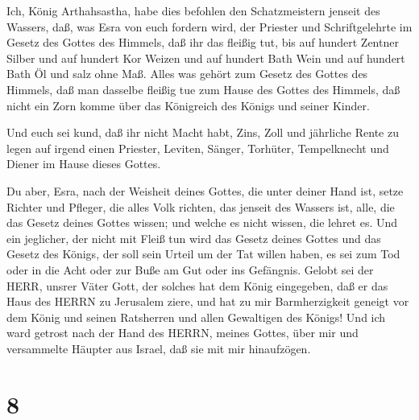  Ich, König Arthahsastha, habe dies befohlen den
Schatzmeistern jenseit des Wassers, daß, was Esra von euch fordern wird,
der Priester und Schriftgelehrte im Gesetz des Gottes des Himmels, daß
ihr das fleißig tut,  bis auf hundert Zentner Silber und
auf hundert Kor Weizen und auf hundert Bath Wein und auf hundert Bath Öl
und salz ohne Maß.  Alles was gehört zum Gesetz des Gottes
des Himmels, daß man dasselbe fleißig tue zum Hause des Gottes des
Himmels, daß nicht ein Zorn komme über das Königreich des Königs und
seiner Kinder.

 Und euch sei kund, daß ihr nicht Macht habt, Zins, Zoll
und jährliche Rente zu legen auf irgend einen Priester, Leviten, Sänger,
Torhüter, Tempelknecht und Diener im Hause dieses Gottes.

 Du aber, Esra, nach der Weisheit deines Gottes, die unter
deiner Hand ist, setze Richter und Pfleger, die alles Volk richten, das
jenseit des Wassers ist, alle, die das Gesetz deines Gottes wissen; und
welche es nicht wissen, die lehret es.  Und ein jeglicher,
der nicht mit Fleiß tun wird das Gesetz deines Gottes und das Gesetz des
Königs, der soll sein Urteil um der Tat willen haben, es sei zum Tod
oder in die Acht oder zur Buße am Gut oder ins Gefängnis. 
Gelobt sei der HERR, unsrer Väter Gott, der solches hat dem König
eingegeben, daß er das Haus des HERRN zu Jerusalem ziere, 
und hat zu mir Barmherzigkeit geneigt vor dem König und seinen
Ratsherren und allen Gewaltigen des Königs! Und ich ward getrost nach
der Hand des HERRN, meines Gottes, über mir und versammelte Häupter aus
Israel, daß sie mit mir hinaufzögen.

\hypertarget{section-7}{%
\section{8}\label{section-7}}

